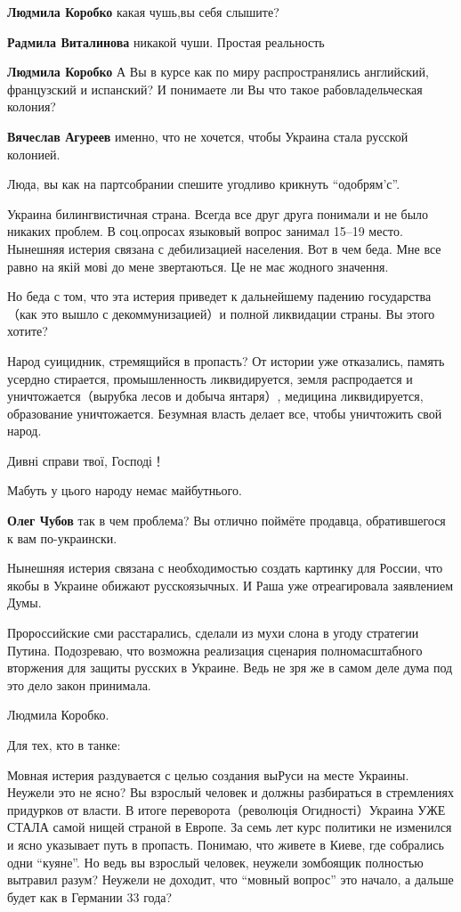 \begin{itemize}
{\begin{itemize}
\textbf{Людмила Коробко} какая чушь,вы себя слышите?

\textbf{Радмила Виталинова} никакой чуши. Простая реальность

\textbf{Людмила Коробко} А Вы в курсе как по миру распространялись английский, французский и испанский? И понимаете ли Вы что такое рабовладельческая колония?

\textbf{Вячеслав Агуреев} именно, что не хочется, чтобы Украина стала русской колонией.


Люда, вы как на партсобрании спешите угодливо крикнуть \enquote{одобрям'с}.

Украина билингвистичная страна. Всегда все друг друга понимали и не было
никаких проблем. В соц.опросах языковый вопрос занимал 15--19 место. Нынешняя
истерия связана с дебилизацией населения. Вот в чем беда. Мне все равно на якій
мові до мене звертаються. Це не має жодного значення.

Но беда с том, что эта истерия приведет к дальнейшему падению государства（как
это вышло с декоммунизацией）и полной ликвидации страны. Вы этого хотите?

Народ суицидник, стремящийся в пропасть? От истории уже отказались, память
усердно стирается, промышленность ликвидируется, земля распродается и
уничтожается（вырубка лесов и добыча янтаря）, медицина ликвидируется,
образование уничтожается. Безумная власть делает все, чтобы уничтожить свой
народ.

Дивні справи твої, Господі！

Мабуть у цього народу немає майбутнього.

\textbf{Олег Чубов} так в чем проблема? Вы отлично поймёте продавца, обратившегося к вам по-украински.

Нынешняя истерия связана с необходимостью создать картинку для России, что
якобы в Украине обижают русскоязычных. И Раша уже отреагировала заявлением
Думы.

Пророссийские сми расстарались, сделали из мухи слона в угоду стратегии Путина.
Подозреваю, что возможна реализация сценария полномасштабного вторжения для
защиты русских в Украине. Ведь не зря же в самом деле дума под это дело закон
принимала.

Людмила Коробко.

Для тех, кто в танке:

Мовная истерия раздувается с целью создания выРуси на месте Украины. Неужели
это не ясно? Вы взрослый человек и должны разбираться в стремлениях придурков
от власти. В итоге переворота（революція Огидності）Украина УЖЕ СТАЛА самой
нищей страной в Европе. За семь лет курс политики не изменился и ясно указывает
путь в пропасть. Понимаю, что живете в Киеве, где собрались одни \enquote{куяне}. Но
ведь вы взрослый человек, неужели зомбоящик полностью вытравил разум? Неужели
не доходит, что \enquote{мовный вопрос} это начало, а дальше будет как в Германии 33
года?


\end{itemize}}
\end{itemize}
